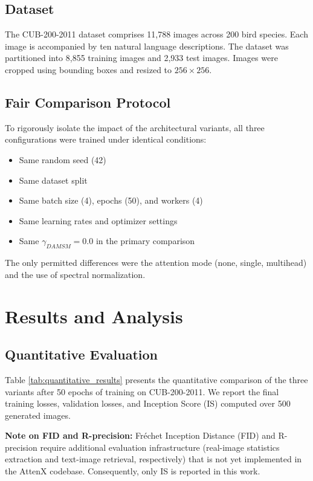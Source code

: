 \documentclass[conference]{IEEEtran}
\begin{document}
\subsection{Dataset}

The CUB-200-2011 dataset \cite{wah2011caltech} comprises 11,788 images across 200 bird species. Each image is accompanied by ten natural language descriptions. The dataset was partitioned into 8,855 training images and 2,933 test images. Images were cropped using bounding boxes and resized to $256 \times 256$.

\subsection{Fair Comparison Protocol}

To rigorously isolate the impact of the architectural variants, all three configurations were trained under identical conditions:
\begin{itemize}
    \item Same random seed (42)
    \item Same dataset split
    \item Same batch size (4), epochs (50), and workers (4)
    \item Same learning rates and optimizer settings
    \item Same $\gamma_{DAMSM} = 0.0$ in the primary comparison
\end{itemize}
The only permitted differences were the attention mode (none, single, multihead) and the use of spectral normalization.

\section{Results and Analysis}

\subsection{Quantitative Evaluation}

Table \ref{tab:quantitative_results} presents the quantitative comparison of the three variants after 50 epochs of training on CUB-200-2011. We report the final training losses, validation losses, and Inception Score (IS) computed over 500 generated images.

\textbf{Note on FID and R-precision:} Fr\'{e}chet Inception Distance (FID) and R-precision require additional evaluation infrastructure (real-image statistics extraction and text-image retrieval, respectively) that is not yet implemented in the AttenX codebase. Consequently, only IS is reported in this work.
\end{document}
